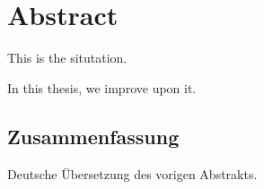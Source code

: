 \begingroup
\let\clearpage\relax
\let\cleardoublepage\relax
\let\cleardoublepage\relax

\chapter*{Abstract}
This is the situtation. 

In this thesis, we improve upon it.

\newpage
\begin{otherlanguage}{ngerman}
\chapter*{Zusammenfassung}
Deutsche Übersetzung des vorigen Abstrakts.

\end{otherlanguage}

\endgroup

\vfill

\color{black}